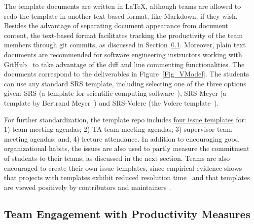 \documentclass[10pt, conference]{IEEEtran}
\begin{document}
The template documents are written in \LaTeX, although teams are allowed to redo
the template in another text-based format, like Markdown, if they wish. Besides
the advantage of separating document appearance from document content, the
text-based format facilitates tracking the productivity of the team members
through git commits, as discussed in Section~\ref{Sec_TeamContribMeasure}.
Moreover, plain text documents are recommended for software engineering
instructors working with GitHub~\cite{felicianoStudentExperiencesUsing2016} to
take advantage of the diff and line commenting functionalities. The documents
correspond to the deliverables in Figure~\ref{Fig_VModel}. The students can use
any standard SRS template, including selecting one of the three options given:
SRS (a template for scientific computing software~\cite{SmithAndLai2005}),
SRS-Meyer (a template by Bertrand Meyer~\cite{Meyer2022}) and SRS-Volere (the
Volere template~\cite{RobertsonAndRobertson1999Vol}).

For further standardization, the template repo includes
\href{Redact link}
{four issue templates} for: 1) team meeting agendas; 2) TA-team meeting agendas;
3) supervisor-team meeting agendas; and, 4) lecture attendance.  In addition to
encouraging good organizational habits, the issues are also used to partly
measure the commitment of students to their teams, as discussed in the next
section.  Teams are also encouraged to create their own issue templates,
since empirical evidence shows that projects with templates
exhibit reduced resolution time~\cite{sulunEmpiricalAnalysisIssue2024} and that
templates are viewed positively by contributors and
maintainers~\cite{liFollowNotFollow2023}.

\subsection{Team Engagement with Productivity Measures} \label{Sec_TeamContribMeasure}
\end{document}
